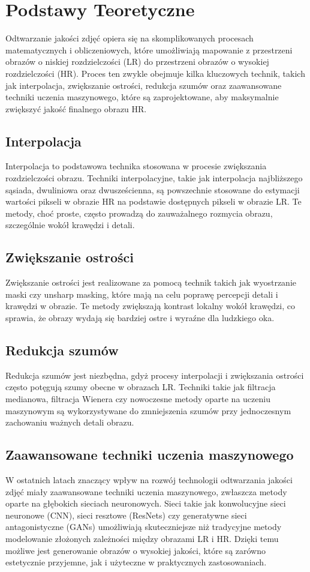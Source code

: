 \documentclass[10pt]{article}
\begin{document}
\section*{Podstawy Teoretyczne}
Odtwarzanie jakości zdjęć opiera się na skomplikowanych procesach matematycznych i obliczeniowych, które umożliwiają mapowanie z przestrzeni obrazów o niskiej rozdzielczości (LR) do przestrzeni obrazów o wysokiej rozdzielczości (HR). Proces ten zwykle obejmuje kilka kluczowych technik, takich jak interpolacja, zwiększanie ostrości, redukcja szumów oraz zaawansowane techniki uczenia maszynowego, które są zaprojektowane, aby maksymalnie zwiększyć jakość finalnego obrazu HR.

\subsection*{Interpolacja}
Interpolacja to podstawowa technika stosowana w procesie zwiększania rozdzielczości obrazu. Techniki interpolacyjne, takie jak interpolacja najbliższego sąsiada, dwuliniowa oraz dwusześcienna, są powszechnie stosowane do estymacji wartości pikseli w obrazie HR na podstawie dostępnych pikseli w obrazie LR. Te metody, choć proste, często prowadzą do zauważalnego rozmycia obrazu, szczególnie wokół krawędzi i detali.

\subsection*{Zwiększanie ostrości}
Zwiększanie ostrości jest realizowane za pomocą technik takich jak wyostrzanie maski czy unsharp masking, które mają na celu poprawę percepcji detali i krawędzi w obrazie. Te metody zwiększają kontrast lokalny wokół krawędzi, co sprawia, że obrazy wydają się bardziej ostre i wyraźne dla ludzkiego oka.

\subsection*{Redukcja szumów}
Redukcja szumów jest niezbędna, gdyż procesy interpolacji i zwiększania ostrości często potęgują szumy obecne w obrazach LR. Techniki takie jak filtracja medianowa, filtracja Wienera czy nowoczesne metody oparte na uczeniu maszynowym są wykorzystywane do zmniejszenia szumów przy jednoczesnym zachowaniu ważnych detali obrazu.

\subsection*{Zaawansowane techniki uczenia maszynowego}
W ostatnich latach znaczący wpływ na rozwój technologii odtwarzania jakości zdjęć miały zaawansowane techniki uczenia maszynowego, zwłaszcza metody oparte na głębokich sieciach neuronowych. Sieci takie jak konwolucyjne sieci neuronowe (CNN), sieci resztowe (ResNets) czy generatywne sieci antagonistyczne (GANs) umożliwiają skuteczniejsze niż tradycyjne metody modelowanie złożonych zależności między obrazami LR i HR. Dzięki temu możliwe jest generowanie obrazów o wysokiej jakości, które są zarówno estetycznie przyjemne, jak i użyteczne w praktycznych zastosowaniach.
\end{document}
